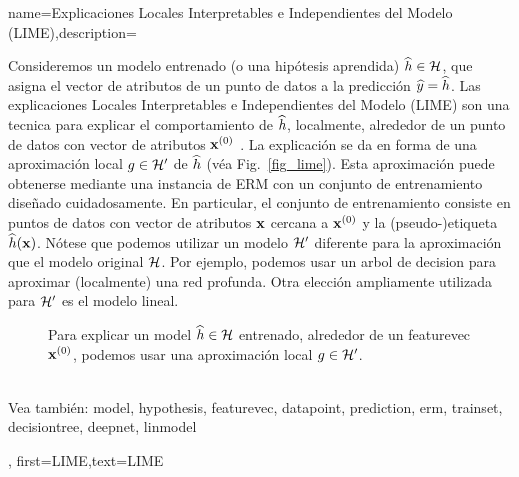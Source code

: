 {name={Explicaciones Locales Interpretables e Independientes del Modelo (LIME)},description={
		Consideremos 
		un modelo entrenado (o una hipótesis aprendida) $\widehat{h} \in \mathcal{H}$, 
		que asigna el vector de atributos de un punto de datos a la predicción $\widehat{y}= \widehat{h}$. 
		Las explicaciones Locales Interpretables e Independientes del Modelo (LIME) son una tecnica para explicar 
		el comportamiento de $\widehat{h}$, localmente, alrededor de un punto de datos con vector de atributos ${\bf x}^{(0)}$ \cite{Ribeiro2016}. 
		La explicación se da en forma de una aproximación local $g \in \mathcal{H}'$ de $\widehat{h}$ (véa Fig.\ \ref{fig_lime}). 
		Esta aproximación puede obtenerse mediante una instancia de ERM con un 
		conjunto de entrenamiento diseñado cuidadosamente. En particular, el conjunto de entrenamiento consiste en puntos de datos con 
		vector de atributos ${\bf x}$ cercana a ${\bf x}^{(0)}$ y la (pseudo-)etiqueta $\widehat{h}({\bf x})$. 
		Nótese que podemos utilizar un modelo $\mathcal{H}'$ diferente para la aproximación que 
		el modelo original $\mathcal{H}$. Por ejemplo, podemos usar un arbol de decision
		para aproximar (localmente) una red profunda. Otra elección ampliamente utilizada para $\mathcal{H}'$ es 
		el modelo lineal. 
		\begin{figure}[htbp]
		\begin{center}
		\end{center}
		\caption{Para explicar un \gls{model} $\widehat{h} \in \mathcal{H}$ entrenado, alrededor de un \gls{featurevec} ${\bf x}^{(0)}$, podemos usar una aproximación local $g \in \mathcal{H}'$. }
		\end{figure}\label{fig_lime}
		\\
		Vea también: \gls{model}, \gls{hypothesis}, \gls{featurevec}, \gls{datapoint}, \gls{prediction}, \gls{erm}, \gls{trainset}, \gls{decisiontree}, \gls{deepnet}, \gls{linmodel}  },
	first={LIME},text={LIME}
}



